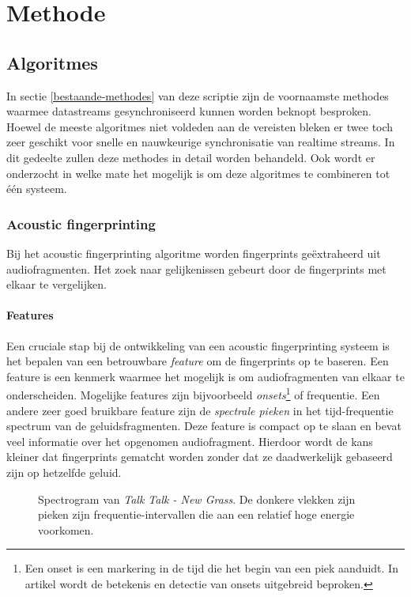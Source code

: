 \chapter{Methode}

\section{Algoritmes}

In sectie \ref{bestaande-methodes} van deze scriptie zijn de voornaamste methodes waarmee datastreams gesynchroniseerd kunnen worden beknopt besproken. Hoewel de meeste algoritmes niet voldeden aan de vereisten bleken er twee toch zeer geschikt voor snelle en nauwkeurige synchronisatie van realtime streams. In dit gedeelte zullen deze methodes in detail worden behandeld. Ook wordt er onderzocht in welke mate het mogelijk is om deze algoritmes te combineren tot één systeem.

\subsection{Acoustic fingerprinting}
\label{acoustic-fingerprinting}

Bij het acoustic fingerprinting algoritme worden fingerprints geëxtraheerd uit audiofragmenten. Het zoek naar gelijkenissen gebeurt door de fingerprints met elkaar te vergelijken. 

\subsubsection{Features}

Een cruciale stap bij de ontwikkeling van een acoustic fingerprinting systeem is het bepalen van een betrouwbare \textit{feature} om de fingerprints op te baseren. Een feature is een kenmerk waarmee het mogelijk is om audiofragmenten van elkaar te onderscheiden. Mogelijke features zijn bijvoorbeeld \textit{onsets}\footnote{Een onset is een markering in de tijd die het begin van een piek aanduidt. In artikel \cite{bello2005tutorial} wordt de betekenis en detectie van onsets uitgebreid beproken.} of frequentie. Een andere zeer goed bruikbare feature zijn de \textit{spectrale pieken} in het tijd-frequentie spectrum van de geluidsfragmenten. Deze feature is compact op te slaan en bevat veel informatie over het opgenomen audiofragment. Hierdoor wordt de kans kleiner dat fingerprints gematcht worden zonder dat ze daadwerkelijk gebaseerd zijn op hetzelfde geluid.

\begin{figure}[h!]
	\captionsetup{width=0.7\textwidth}
	\caption[Voorbeeld van een spectrogram]{Spectrogram van \textit{Talk Talk - New Grass}. De donkere vlekken zijn pieken zijn frequentie-intervallen die aan een relatief hoge energie voorkomen.}
	\begin{center}
		\advance\parskip0.3cm
		
	\end{center}
	\label{spectrogram}
\end{figure}

